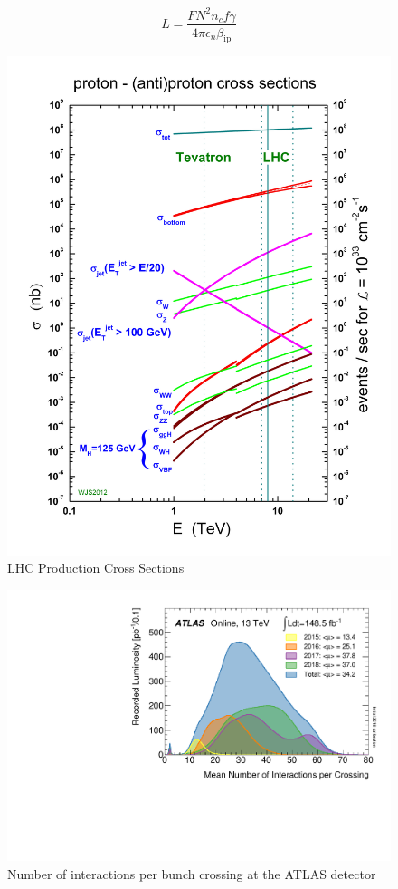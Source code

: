 \begin{equation}
L = \frac{FN^2 n_c f\gamma}{4\pi \epsilon_n \beta_{\text{ip}}}
\label{eq:lumi}
\end{equation}


\begin{figure}[htpb!]
\begin{center}
  \includegraphics[width=0.6\linewidth]{figures/LHC/crosssections2013}
\caption{LHC Production Cross Sections \cite{stirlingprivate}}
\label{fig:lhc-lhccrossection}
\end{center}
\end{figure}

\begin{figure}[htpb!]
\begin{center}
  \includegraphics[width=0.6\linewidth]{figures/LHC/mu_2015_2018}
\caption{Number of interactions per bunch crossing at the ATLAS detector}
\label{fig:lhc-mu}
\end{center}
\end{figure}

